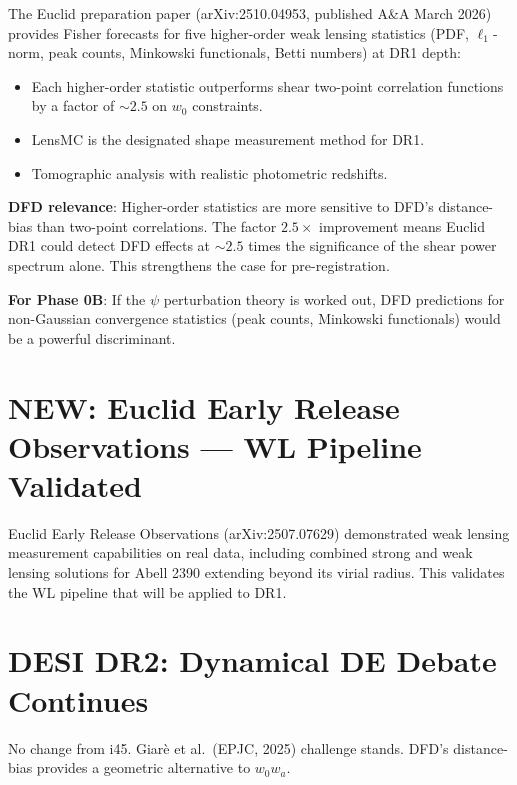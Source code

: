 \documentclass[11pt,a4paper]{article}
\newcommand{\NEW}{\textcolor{dfdblue}{\textbf{NEW}}}
\begin{document}
\begin{tcolorbox}[colback=blue!5!white, colframe=blue!60!black,
  title={Euclid Prep.\ LXXXV (A\&A, March 2026): DR1 Higher-Order WL Statistics}]

The Euclid preparation paper (arXiv:2510.04953, published A\&A March 2026) provides Fisher forecasts for five higher-order weak lensing statistics (PDF, $\ell_1$-norm, peak counts, Minkowski functionals, Betti numbers) at DR1 depth:

\begin{itemize}
\item Each higher-order statistic outperforms shear two-point correlation functions by a factor of $\sim 2.5$ on $w_0$ constraints.
\item LensMC is the designated shape measurement method for DR1.
\item Tomographic analysis with realistic photometric redshifts.
\end{itemize}

\textbf{DFD relevance}: Higher-order statistics are more sensitive to DFD's distance-bias than two-point correlations. The factor $2.5\times$ improvement means Euclid DR1 could detect DFD effects at $\sim 2.5$ times the significance of the shear power spectrum alone. This strengthens the case for pre-registration.

\textbf{For Phase 0B}: If the $\psi$ perturbation theory is worked out, DFD predictions for non-Gaussian convergence statistics (peak counts, Minkowski functionals) would be a powerful discriminant.
\end{tcolorbox}

\section{\NEW: Euclid Early Release Observations --- WL Pipeline Validated}

Euclid Early Release Observations (arXiv:2507.07629) demonstrated weak lensing measurement capabilities on real data, including combined strong and weak lensing solutions for Abell 2390 extending beyond its virial radius. This validates the WL pipeline that will be applied to DR1.

\section{DESI DR2: Dynamical DE Debate Continues}

No change from i45. Giar\`e et al.\ (EPJC, 2025) challenge stands. DFD's distance-bias provides a geometric alternative to $w_0 w_a$.
\end{document}
